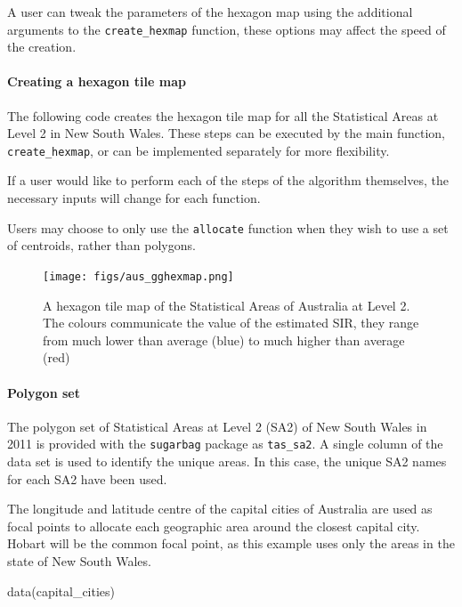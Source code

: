 A user can tweak the parameters of the hexagon map using the additional
arguments to the \texttt{create\_hexmap} function, these options may
affect the speed of the creation.

\hypertarget{creating-a-hexagon-tile-map}{%
\paragraph{Creating a hexagon tile
map}\label{creating-a-hexagon-tile-map}}

The following code creates the hexagon tile map for all the Statistical
Areas at Level 2 in New South Wales. These steps can be executed by the
main function, \texttt{create\_hexmap}, or can be implemented separately
for more flexibility.

If a user would like to perform each of the steps of the algorithm
themselves, the necessary inputs will change for each function.

Users may choose to only use the \texttt{allocate} function when they
wish to use a set of centroids, rather than \citep{sf} polygons.

\begin{figure}[h]
\centering
\texttt{[image: figs/aus\_gghexmap.png]}
\caption{\label{fig:melanoma-hex}A hexagon tile map of the Statistical Areas of Australia at Level 2. The colours communicate the value of the estimated SIR, they range from much lower than average (blue) to much higher than average (red)}
\end{figure}

\hypertarget{polygon-set}{%
\paragraph{Polygon set}\label{polygon-set}}

The polygon set of Statistical Areas at Level 2 (SA2) \citep{abs2011} of
New South Wales in 2011 is provided with the \texttt{sugarbag} package
as \texttt{tas\_sa2}. A single column of the data set is used to
identify the unique areas. In this case, the unique SA2 names for each
SA2 have been used.

The longitude and latitude centre of the capital cities of Australia are
used as focal points to allocate each geographic area around the closest
capital city. Hobart will be the common focal point, as this example
uses only the areas in the state of New South Wales.

\begin{Schunk}
\begin{Sinput}
data(capital_cities)
\end{Sinput}
\end{Schunk}

